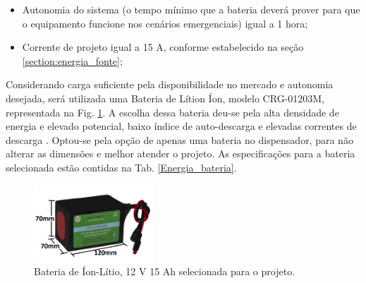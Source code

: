 \begin{itemize}
    \item Autonomia do sistema (o tempo mínimo que a bateria deverá prover para que o equipamento funcione nos cenários emergenciais) igual a 1 hora;
    \item Corrente de projeto igual a 15 A, conforme estabelecido na seção \ref{section:energia_fonte};
\end{itemize}


Considerando carga suficiente pela disponibilidade no mercado e autonomia desejada, será utilizada uma Bateria de Lítion Íon, modelo CRG-01203M, representada na Fig. \ref{fig:energia_bateria}. A escolha dessa bateria deu-se pela alta densidade de energia e elevado potencial, baixo índice de auto-descarga e elevadas correntes de descarga \cite{STA}. Optou-se pela opção de apenas uma bateria no dispensador, para não alterar as dimensões e melhor atender o projeto. As especificações para a bateria selecionada estão contidas na Tab. \ref{Energia_bateria}.

\begin{figure}[H]
\centering
    \includegraphics[width=0.4\textwidth]{figuras/energia/fotos_componentes/bateria.png}
    \caption{Bateria de Íon-Lítio, 12 V 15 Ah selecionada para o projeto.}
    \label{fig:energia_bateria}
\end{figure}

